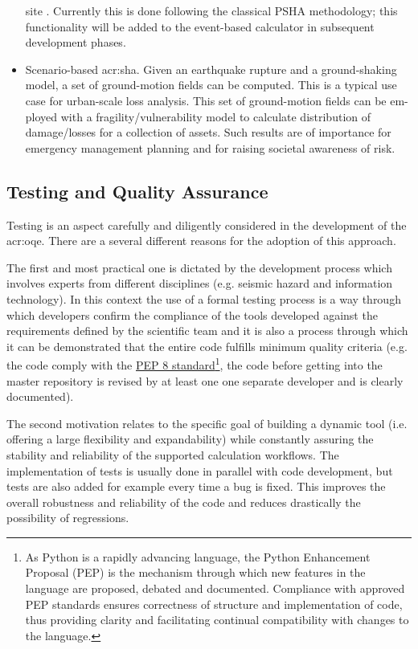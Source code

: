\begin{itemize}
    site \parencite{bazzurro1999}. Currently this is done following 
    the classical PSHA methodology; this functionality will be added to 
    the event-based calculator in subsequent development phases.
\item Scenario-based \gls{acr:sha}. Given an earthquake rupture and a 
    ground-shaking model, a set of ground-motion fields can be computed. 
    This is a typical use case for urban-scale loss analysis. This set of
    ground-motion fields can be em- ployed with a fragility/vulnerability 
    model to calculate distribution of damage/losses for a collection of
    assets. Such results are of importance for emergency management planning
    and for raising societal awareness of risk.
\end{itemize}
%
\subsection{Testing and Quality Assurance}
%
Testing is an aspect carefully and diligently considered 
in the development of the \gls{acr:oqe}. There are a several 
different reasons for the adoption of this approach.

The first and most practical one is dictated by the development 
process which involves experts from different disciplines (e.g. 
seismic hazard and information technology). 
%
In this context the use of a formal testing process is a way through which
developers confirm the compliance of the tools developed against the
requirements defined by the scientific team and it is also a process through
which it can be demonstrated that the entire code fulfills minimum quality
criteria (e.g. the code comply with the
\href{http://legacy.python.org/dev/peps/pep-0008/}{PEP 8 standard}\footnote{As
Python is a rapidly advancing language, the Python Enhancement Proposal (PEP) is
the mechanism through which new features in the language are proposed, debated
and documented. Compliance with approved PEP standards ensures correctness of
structure and implementation of code, thus providing clarity and facilitating
continual compatibility with changes to the language.}, the code before getting
into the master repository is revised by at least one one separate developer and
is clearly documented).
 
The second motivation relates to the specific goal of building a dynamic tool
(i.e. offering a large flexibility and expandability) while constantly assuring
the stability and reliability of the supported calculation workflows.
%
The implementation of tests is usually done in parallel with code development,
but tests are also added for example every time a bug is fixed.
%
This improves the overall robustness and reliability of the code and reduces
drastically the possibility of regressions.


